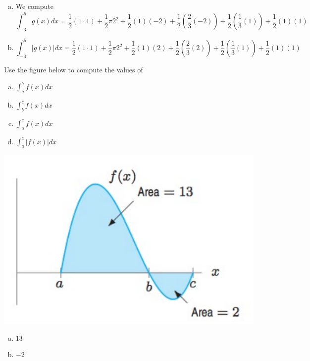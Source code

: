 \documentclass[11pt]{exam}
\begin{document}
\begin{questions}
\begin{solution}
  \begin{enumerate}[(a)]
  \item We compute \[
      \int_{-3}^5 g(x) dx = \frac{1}{2}(1 \cdot 1) + \frac{1}{2} \pi
      2^2 + \frac{1}{2}(1)(-2) + \frac{1}{2}\left( \frac{2}{3}(-2)
      \right) + \frac{1}{2}\left( \frac{1}{3}(1) \right) + \frac{1}{2}(1)(1)
    \]
  \item \[
      \int_{-3}^5 |g(x)| dx =  \frac{1}{2}(1 \cdot 1) + \frac{1}{2} \pi
      2^2 + \frac{1}{2}(1)(2) + \frac{1}{2}\left( \frac{2}{3}(2)
      \right) + \frac{1}{2}\left( \frac{1}{3}(1) \right) + \frac{1}{2}(1)(1)
    \]
  \end{enumerate}
\end{solution}
\question Use the figure below to compute the values of 
  \begin{multicols}{2}
    \begin{enumerate}[(a)]
    \item \(\int_a^b f(x) dx\)
    \item \(\int_b^c f(x) dx\)
    \item \(\int_a^c f(x) dx\)
    \item \(\int_a^c |f(x)| dx\)
    \end{enumerate}
    \includegraphics[scale=0.5]{Figures/no29graph.pdf}
  \end{multicols}
  \begin{solution}
    \begin{enumerate}[(a)]
    \item \(13\)
    \item \(-2\)

\end{enumerate}
\end{solution}
\end{questions}
\end{document}
